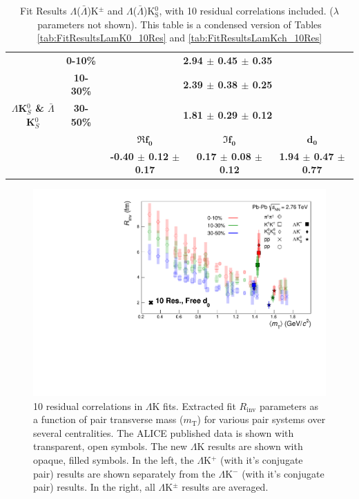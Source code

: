 \documentclass[../AnalysisNoteJBuxton.tex]{subfiles}
\begin{document}
\begin{landscape}
\begin{table}[htbp]
{\begin{tabular}{|c|c|c|c|c|}
  \multirow{5}{*}{\large \textbf{$\Lambda$K$^{0}_{S}$ \& $\bar{\Lambda}$K$^{0}_{S}$}}  
   &  \textbf{0-10\%} & \multicolumn{3}{c|}{\textbf{2.94 $\pm$ 0.45 $\pm$ 0.35}} \\  %
   & \textbf{10-30\%} & \multicolumn{3}{c|}{\textbf{2.39 $\pm$ 0.38 $\pm$ 0.25}} \\  %
   & \textbf{30-50\%} & \multicolumn{3}{c|}{\textbf{1.81 $\pm$ 0.29 $\pm$ 0.12}} \\  %
   \cline{2-5}   
   & & \large $\mathbf{\Re f_{0}}$ & \large $\mathbf{\Im f_{0}}$ & \large $\mathbf{d_{0}}$ \\
   \cline{3-5} 
   & & \textbf{-0.40 $\pm$ 0.12 $\pm$ 0.17} & \textbf{0.17 $\pm$ 0.08 $\pm$ 0.12} & \textbf{1.94 $\pm$ 0.47 $\pm$ 0.77} \\
  \hline
 \end{tabular}}
 \caption{Fit Results $\Lambda$($\bar{\Lambda}$)K$^{\pm}$ and $\Lambda$($\bar{\Lambda}$)K$^{0}_{\mathrm{S}}$, with 10 residual correlations included. ($\lambda$ parameters not shown).  This table is a condensed version of Tables \ref{tab:FitResultsLamK0_10Res} and \ref{tab:FitResultsLamKch_10Res}} 
 \label{tab:FitResultsLamKCondensed_10Res}
\end{table}

\end{landscape}
\pagestyle{plain}

\begin{figure}[h]
  \centering
  \includegraphics[width=\textwidth]{7_ResultsAndDiscussion/Figures/mTscaling_MinvCalc_OutlinedPoints_OthersTransparent_10Res_FreeD0.pdf}
  \caption[$m_{\mathrm{T}}$ Scaling of Radii: 10 Residuals in Fit]{10 residual correlations in $\Lambda$K fits.  Extracted fit $R_{\mathrm{inv}}$ parameters as a function of pair transverse mass ($m_{\mathrm{T}}$) for various pair systems over several centralities. The ALICE published data \cite{Adam:2015vja} is shown with transparent, open symbols.  The new $\Lambda$K results are shown with opaque, filled symbols.  In the left, the $\Lambda$K$^{+}$ (with it's conjugate pair) results are shown separately from the $\Lambda$K$^{-}$ (with it's conjugate pair) results.  In the right, all $\Lambda$K$^{\pm}$ results are averaged.}
  \label{fig:mTScalingOfRadii}
\end{figure}

\clearpage
\end{document}
